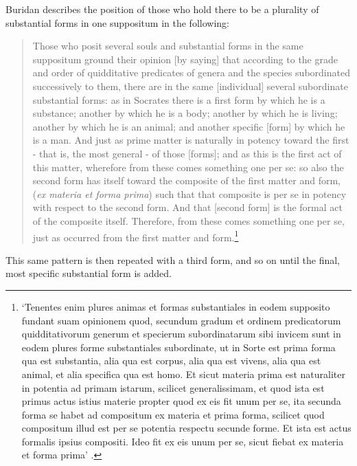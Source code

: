 \documentclass[]{article}
\begin{document}
Buridan describes the position of those who hold there to be a plurality of substantial forms in one suppositum in the following:
	\begin{quote}
	Those who posit several souls and substantial forms in the same suppositum ground their opinion [by saying] that according to the grade and order of quidditative predicates of genera and the species subordinated successively to them, there are in the same [individual] several subordinate substantial forms: as in Socrates there is a first form by which he is a substance; another by which he is a body; another by which he is living; another by which he is an animal; and another specific [form] by which he is a man. And just as prime matter is naturally in potency toward the first - that is, the most general - of those [forms]; and as this is the first act of this matter, wherefore from these comes something one per se: so also the second form has itself toward the composite of the first matter and form,(\textit{ex materia et forma prima})  such that that composite is per se in potency with respect to the second form. And that [second form] is the formal act of the composite itself. Therefore, from these comes something one per se, just as occurred from the first matter and form.\footnote{`Tenentes enim plures animas et formas substantiales in eodem supposito fundant suam opinionem quod, secundum gradum et ordinem predicatorum quidditativorum generum et specierum subordinatarum sibi invicem sunt in eodem plures forme substantiales subordinate, ut in Sorte est prima forma qua est substantia, alia qua est corpus, alia qua est vivens, alia qua est animal, et alia specifica qua est homo. Et sicut materia prima est naturaliter in potentia ad primam istarum, scilicet generalissimam, et quod ista est primus actus istius materie propter quod ex eis fit unum per se, ita secunda forma se habet ad compositum ex materia et prima forma, scilicet quod compositum illud est per se potentia respectu secunde forme. Et ista est actus formalis ipsius compositi. Ideo fit ex eis unum per se, sicut fiebat ex materia et forma prima' \autocite[II.4.10]{BuridanQDA}.}
	\end{quote}
		
This same pattern is then repeated with a third form, and so on until the final, most specific substantial form is added.
\end{document}
